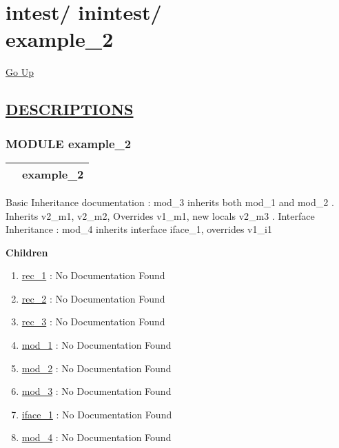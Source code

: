 \chapter*{\color{headfile}
{\large intest\slash\hspace{0pt}}
{\large inintest\slash\hspace{0pt}}
 \\
example_2
}
\hypertarget{ecldoc:toc:intest.inintest.example_2}{}
\hyperlink{ecldoc:toc:root/intest/inintest}{Go Up}


\section*{\underline{\textsf{DESCRIPTIONS}}}
\subsection*{\textsf{\colorbox{headtoc}{\color{white} MODULE}
example\_2}}

\hypertarget{ecldoc:intest.inintest.example_2}{}

{\renewcommand{\arraystretch}{1.5}
\begin{tabularx}{\textwidth}{|>{\raggedright\arraybackslash}l|X|}
\hline
\hspace{0pt}\mytexttt{\color{red} } & \textbf{example\_2} \\
\hline
\end{tabularx}
}

\par





Basic Inheritance documentation : mod\_3 inherits both mod\_1 and mod\_2 . Inherits v2\_m1, v2\_m2, Overrides v1\_m1, new locals v2\_m3 . Interface Inheritance : mod\_4 inherits interface iface\_1, overrides v1\_i1







\textbf{Children}
\begin{enumerate}
\item \hyperlink{ecldoc:intest.inintest.example_2.rec_1}{rec\_1}
: No Documentation Found
\item \hyperlink{ecldoc:intest.inintest.example_2.rec_2}{rec\_2}
: No Documentation Found
\item \hyperlink{ecldoc:intest.inintest.example_2.rec_3}{rec\_3}
: No Documentation Found
\item \hyperlink{ecldoc:intest.inintest.example_2.mod_1}{mod\_1}
: No Documentation Found
\item \hyperlink{ecldoc:intest.inintest.example_2.mod_2}{mod\_2}
: No Documentation Found
\item \hyperlink{ecldoc:intest.inintest.example_2.mod_3}{mod\_3}
: No Documentation Found
\item \hyperlink{ecldoc:intest.inintest.example_2.iface_1}{iface\_1}
: No Documentation Found
\item \hyperlink{ecldoc:intest.inintest.example_2.mod_4}{mod\_4}
: No Documentation Found
\end{enumerate}


